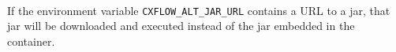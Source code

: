 
\noindent\\If the environment variable \texttt{CXFLOW\_ALT\_JAR\_URL} contains a URL to a \cxflow jar, 
that jar will be downloaded and executed instead of the \cxflow jar embedded in the container.

